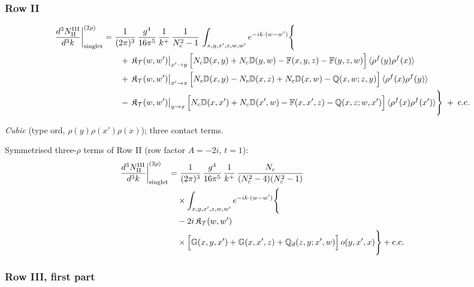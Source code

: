 \documentclass[9pt]{article}
\def\mf#1{\mathbb{#1}}
\numberwithin{equation}{section}
\begin{document}
{\subsubsection*{Row II}

\begin{align}
\frac{d^{3}N^{\rm III}_{\rm II}}{d^{3}k}\bigg|^{(2\rho)}_{\rm singlet}&=\frac{1}{(2\pi)^{3}}\,\frac{g^{4}}{16\pi^{5}}\,\frac{1}{k^{+}}\,\frac{1}{N_{c}^{2}-1}\,\int_{x,y,x',z,w,w'}e^{-ik\cdot(w-w')}\Bigg\{\notag\\
&\qquad +\,\mathfrak{K}_{\mathcal{T}}(w,w')\big|_{x'\to y}\,\Big[N_{c}\mf{D}(x,y)+N_{c}\mf{D}(y,w)-\mf{F}(x,y,z)-\mf{F}(y,z,w)\Big]\,\langle\rho^{f}(y)\rho^{f}(x)\rangle\notag\\
&\qquad +\,\mathfrak{K}_{\mathcal{T}}(w,w')\big|_{x'\to x}\,\Big[N_{c}\mf{D}(x,y)-N_{c}\mf{D}(x,z)+N_{c}\mf{D}(x,w)-\mf{Q}(x,w;z,y)\Big]\,\langle\rho^{f}(x)\rho^{f}(y)\rangle\notag\\
&\qquad -\,\mathfrak{K}_{\mathcal{T}}(w,w')\big|_{y\to x}\,\Big[N_{c}\mf{D}(x,x')+N_{c}\mf{D}(x',w)-\mf{F}(x,x',z)-\mf{Q}(x,z;w,x')\Big]\,\langle\rho^{f}(x)\rho^{f}(x')\rangle\Bigg\}\;+\;{\rm c.c.}\label{eq:s-III-II}
\end{align}

\emph{Cubic} (type ord, $\rho(y)\rho(x')\rho(x)$); three contact terms.

 Symmetrised three-$\rho$ terms of Row II (row factor $A=-2i$, $t=1$):
\begin{align}
\frac{d^{3}N^{\rm III}_{\rm II}}{d^{3}k}\bigg|^{(3\rho)}_{\rm singlet}&=\frac{1}{(2\pi)^{3}}\,\frac{g^{4}}{16\pi^{5}}\,\frac{1}{k^{+}}\,\frac{N_{c}}{(N_{c}^{2}-4)(N_{c}^{2}-1)}\notag\\
&\quad\times\int_{x,y,x',z,w,w'}e^{-ik\cdot(w-w')}\Bigg\{\notag\\
&\quad-2i\,\mathfrak{K}_{\mathcal{T}}(w,w')\notag\\
&\quad\times\Big[\mf{G}(x,y,x')+\mf{G}(x,x',z)+\mf{Q}_{d}(z,y;x',w)\Big]\,o(y,x',x)\Bigg\}+{\rm c.c.}\label{eq:s-o-III-II}
\end{align}
\subsubsection*{Row III, first part}

}
\end{document}
